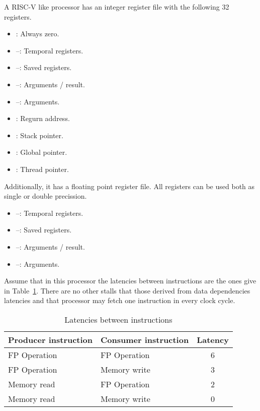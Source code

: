\begin{acexercise}\end{acexercise}

A RISC-V like processor has an integer register file with the following 32 registers.

\begin{itemize}
  \item {}: Always zero.
  \item {}--: Temporal registers.
  \item {}--: Saved registers.
  \item {}--: Arguments / result.
  \item {}--: Arguments.
  \item {}: Regurn address.
  \item {}: Stack pointer.
  \item {}: Global pointer.
  \item {}: Thread pointer.
\end{itemize}

Additionally, it has a floating point register file.
All registers can be used both as single or double precission.

\begin{itemize}
  \item {}--: Temporal registers.
  \item {}--: Saved registers.
  \item {}--: Arguments / result.
  \item {}--: Arguments.
\end{itemize}

Assume that in this processor the latencies between instructions are the ones
give in Table~\ref{tab:unroll-1:latencies}. 
There are no other stalls that those derived from data dependencies latencies
and that processor may fetch one instruction in every clock cycle.

\begin{table}[htb]
\begin{tabular}{|l|l|c|}
\hline
\textbf{Producer instruction} &
\textbf{Consumer instruction} &
\textbf{Latency}
\\
\hline

FP Operation & FP Operation & 6\\
\hline

FP Operation & Memory write & 3\\
\hline

Memory read & FP Operation & 2\\
\hline

Memory read & Memory write & 0\\
\hline

\end{tabular}
\caption{Latencies between instructions}
\label{tab:unroll-1:latencies}
\end{table}

